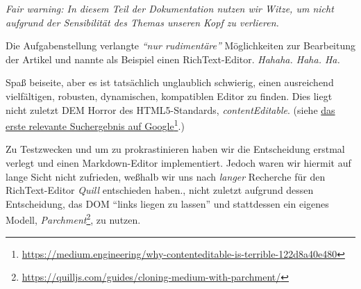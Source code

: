 \emph{Fair warning: In diesem Teil der Dokumentation nutzen wir Witze,
um nicht aufgrund der Sensibilität des Themas unseren Kopf zu verlieren.}

Die Aufgabenstellung verlangte \emph{``nur rudimentäre''} Möglichkeiten zur Bearbeitung der Artikel
und nannte als Beispiel einen RichText-Editor.
\emph{Hahaha. Haha. Ha.}

Spaß beiseite,
aber es ist tatsächlich unglaublich schwierig,
einen ausreichend vielfältigen, robusten, dynamischen, kompatiblen
Editor zu finden.
Dies liegt nicht zuletzt DEM Horror des HTML5-Standards, \emph{contentEditable}.
(siehe \href{https://medium.engineering/why-contenteditable-is-terrible-122d8a40e480}%
{das erste relevante Suchergebnis auf Google}\footnote{\url{https://medium.engineering/why-contenteditable-is-terrible-122d8a40e480}}.)

Zu Testzwecken und um zu prokrastinieren haben wir die Entscheidung erstmal verlegt
und einen Markdown-Editor implementiert.
Jedoch waren wir hiermit auf lange Sicht nicht zufrieden,
weßhalb wir uns nach \emph{langer} Recherche für den RichText-Editor \emph{Quill} entschieden haben.,
nicht zuletzt aufgrund dessen Entscheidung,
das DOM ``links liegen zu lassen'' und stattdessen ein eigenes Modell,
\emph{Parchment}\footnote{\url{https://quilljs.com/guides/cloning-medium-with-parchment/}},
zu nutzen.
